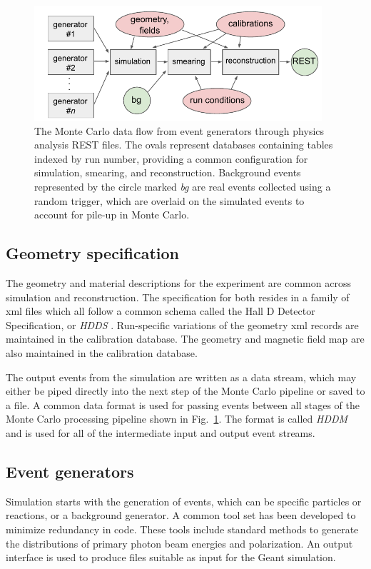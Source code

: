 \begin{figure}[t]\centering
\includegraphics[width=0.95\textwidth]{figures/MonteCarlo_flow.pdf}
\caption[]{\label{fig:MC-data-flow}The Monte Carlo data flow from event generators through physics analysis REST files. The ovals represent databases containing tables indexed by run number, providing a common configuration for simulation, smearing, and reconstruction. Background events represented by the circle marked \emph{bg} are real events collected using a random trigger, which are overlaid on the simulated events to account for pile-up in Monte Carlo.}
\end{figure}

\subsection[Geometry specification]{\label{sec:materialscan}Geometry specification}
The geometry and material descriptions for the experiment are common across simulation and reconstruction. The specification for both resides in a family of xml files which all follow a common schema called the Hall D Detector Specification, or \emph{HDDS} \cite{CITATION??}. Run-specific variations of the geometry xml records are maintained in the calibration database. The geometry and magnetic field map are also maintained in the calibration database.

The output events from the simulation are written as a data stream, which may either be piped directly into the next step of the Monte Carlo pipeline or saved to a file. A common data format is used for passing events between all stages of the Monte Carlo processing pipeline shown in Fig.~\ref{fig:MC-data-flow}. The format is called {\em HDDM} and is used for all of the intermediate input and output event streams.

\subsection{Event generators \label{sec:generators}}
Simulation starts with the generation of events, which can be specific particles or reactions, or a background generator. A common tool set has been developed to minimize redundancy in code. These tools include standard methods to generate the distributions of primary photon beam energies and polarization. An output interface is used to produce files suitable as input for the Geant simulation.

